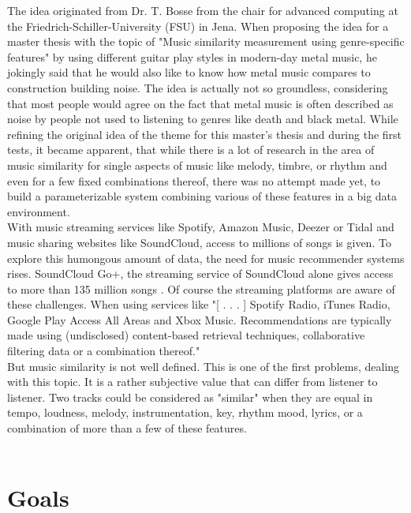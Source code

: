 The idea originated from Dr. T. Bosse from the chair for advanced computing at the Friedrich-Schiller-University (FSU) in Jena. When proposing the idea for a master thesis with the topic of "Music similarity measurement using genre-specific features" by using different guitar play styles in modern-day metal music, he jokingly said that he would also like to know how metal music compares to construction building noise. The idea is actually not so groundless, considering that most people would agree on the fact that metal music is often described as noise by people not used to listening to genres like death and black metal.
While refining the original idea of the theme for this master's thesis and during the first tests, it became apparent, that while there is a lot of research in the area of music similarity for single aspects of music like melody, timbre, or rhythm and even for a few fixed combinations thereof, there was no attempt made yet, to build a parameterizable system combining various of these features in a big data environment.\\
With music streaming services like Spotify, Amazon Music, Deezer or Tidal and music sharing websites like SoundCloud, access to millions of songs is given. To explore this humongous amount of data, the need for music recommender systems rises. SoundCloud Go+, the streaming service of SoundCloud alone gives access to more than 135 million songs \cite{soundcloudgo}. 
Of course the streaming platforms are aware of these challenges. When using services like "[ . . . ] Spotify Radio, iTunes Radio, Google Play Access All Areas and Xbox Music. Recommendations are typically made using (undisclosed) content-based retrieval techniques, collaborative filtering data or a combination thereof." \cite[p. 9]{knees1}\\
But music similarity is not well defined. This is one of the first problems, dealing with this topic. It is a rather subjective value that can differ from listener to listener. Two tracks could be considered as "similar" when they are equal in tempo, loudness, melody, instrumentation, key, rhythm mood, lyrics, or a combination of more than a few of these features.\\
\ \\
\section{Goals}

